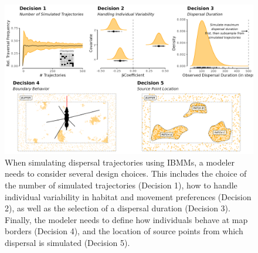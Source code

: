 \documentclass[../FinalThesis.tex]{subfiles}
\begin{document}
\begin{figure}
  \begin{center}
  \includegraphics[width = \textwidth]{Figures/ModelingDecisions.png}
  \caption{When simulating dispersal trajectories using IBMMs, a modeler needs
  to consider several design choices. This includes the choice of the number of
  simulated trajectories (Decision 1), how to handle individual variability in
  habitat and movement preferences (Decision 2), as well as the selection of a
  dispersal duration (Decision 3). Finally, the modeler needs to define how
  individuals behave at map borders (Decision 4), and the location of source
  points from which dispersal is simulated (Decision 5).}
  \label{ModelingDecisions}
  \end{center}
\end{figure}
\end{document}
